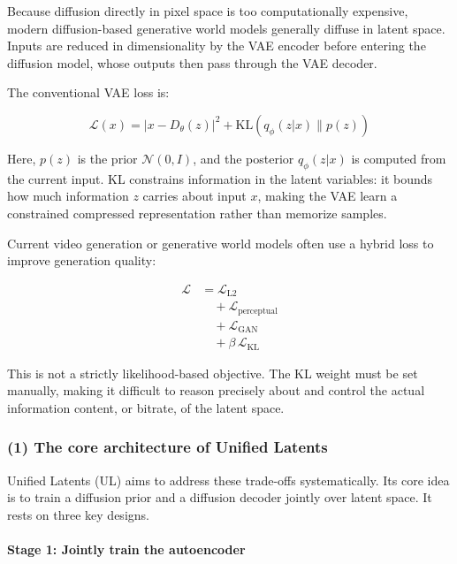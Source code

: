 Because diffusion directly in pixel space is too computationally expensive, modern diffusion-based generative world models generally diffuse in latent space. Inputs are reduced in dimensionality by the VAE encoder before entering the diffusion model, whose outputs then pass through the VAE decoder.

The conventional VAE loss is:

\[
\mathcal{L}(x)=|x-D_\theta(z)|^2+\mathrm{KL}(q_\phi(z|x)\|p(z))
\]

Here, \(p(z)\) is the prior \(\mathcal{N}(0,I)\), and the posterior \(q_\phi(z|x)\) is computed from the current input. KL constrains information in the latent variables: it bounds how much information \(z\) carries about input \(x\), making the VAE learn a constrained compressed representation rather than memorize samples.

Current video generation or generative world models often use a hybrid loss to improve generation quality:

\[
\begin{aligned}
\mathcal{L}
&= \mathcal{L}_{\mathrm{L2}}
\\
&\quad + \mathcal{L}_{\mathrm{perceptual}}
\\
&\quad + \mathcal{L}_{\mathrm{GAN}}
\\
&\quad + \beta\,\mathcal{L}_{\mathrm{KL}}
\end{aligned}
\]

This is not a strictly likelihood-based objective. The KL weight must be set manually, making it difficult to reason precisely about and control the actual information content, or bitrate, of the latent space.

\hypertarget{the-core-architecture-of-unified-latents}{%
\subsubsection{(1) The core architecture of Unified Latents}\label{the-core-architecture-of-unified-latents}}

Unified Latents (UL) aims to address these trade-offs systematically. Its core idea is to train a diffusion prior and a diffusion decoder jointly over latent space. It rests on three key designs.

\hypertarget{stage-1-jointly-train-the-autoencoder}{%
\paragraph{Stage 1: Jointly train the autoencoder}\label{stage-1-jointly-train-the-autoencoder}}

